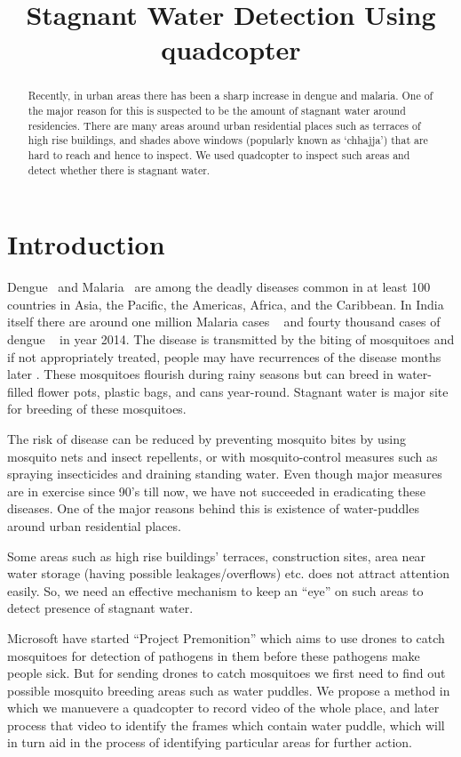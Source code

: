 \documentclass[times,10pt,twocolumn,letterpaper]{article}
\title{Stagnant Water Detection Using quadcopter}
\author{}
\begin{document}
\maketitle

\begin{abstract}
Recently, in urban areas there has been a sharp increase in dengue and malaria.
One of the major reason for this is suspected to be the amount of stagnant
water around residencies. There are many areas around urban residential places
such as terraces of high rise buildings, and shades above windows
(popularly known as `chhajja') that are hard to reach and hence to inspect. We
used quadcopter to inspect such areas and detect whether there is stagnant
water.

\end{abstract}

\section{Introduction}
Dengue~\cite{WHO15Dengue} and Malaria~\cite{WHO15Malaria} are among the deadly
diseases common in at least 100 countries in Asia, the Pacific, the Americas,
Africa, and the Caribbean. In India itself there are around one million Malaria
cases ~\cite{NVBDP_Malaria} and fourty thousand cases of dengue
~\cite{NVBDP_Dengue} in year 2014. The disease is transmitted by the biting of
mosquitoes and if not appropriately treated, people may have recurrences of the
disease months later \cite{Cecilia14}. These mosquitoes flourish during rainy seasons but can breed
in water-filled flower pots, plastic bags, and cans year-round. Stagnant water
is major site for breeding of these mosquitoes.

The risk of disease can be reduced by preventing mosquito bites by using
mosquito nets and insect repellents, or with mosquito-control measures such as
spraying insecticides and draining standing water.  Even though major measures
are in exercise since 90’s till now, we have not succeeded in eradicating these
diseases. One of the major reasons behind this is existence of water-puddles
around urban residential places.

Some areas such as high rise buildings' terraces, construction sites, area
near water storage (having possible leakages/overflows) etc. does not attract
attention easily. So, we need an effective mechanism to keep an ``eye'' on such
areas to detect presence of stagnant water. 

Microsoft \cite{Microsoft15} have started ``Project Premonition'' which aims to
use drones to catch mosquitoes for detection of pathogens in them before these
pathogens make people sick. But for sending drones to catch mosquitoes we first
need to find out possible mosquito breeding areas such as water puddles. We
propose a method in which we manuevere a quadcopter to record video of the
whole place, and later process that video to identify the frames which contain
water puddle, which will in turn aid in the process of identifying particular
areas for further action.
\end{document}
